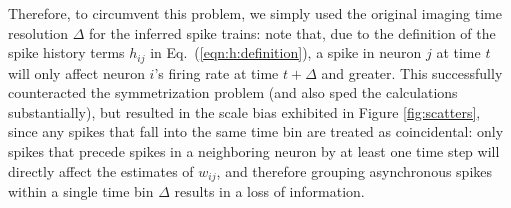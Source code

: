 \documentclass[aoas,preprint]{imsart}
\begin{document}
Therefore, to circumvent this problem, we simply used the original
imaging time resolution $\Delta$ for the inferred spike trains: note
that, due to the definition of the spike history terms $h_{ij}$ in
Eq.~(\ref{eqn:h:definition}), a spike in neuron $j$ at time $t$ will
only affect neuron $i$'s firing rate at time $t+\Delta$ and greater.
This successfully counteracted the symmetrization problem (and also
sped the calculations substantially), but resulted in the scale bias
exhibited in Figure \ref{fig:scatters}, since any spikes that fall
into the same time bin are treated as coincidental: only spikes that
precede spikes in a neighboring neuron by at least one time step will
directly affect the estimates of $w_{ij}$, and therefore grouping
asynchronous spikes within a single time bin $\Delta$ results in a
loss of information.
\end{document}
